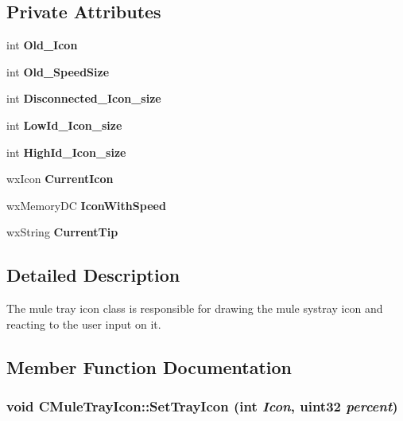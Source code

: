 \subsection*{Private Attributes}
\begin{DoxyCompactItemize}
\item 
int {\bfseries Old\_\-Icon}\label{classCMuleTrayIcon_a71dab918ad04ba3b0acf9b3c81f45ba4}

\item 
int {\bfseries Old\_\-SpeedSize}\label{classCMuleTrayIcon_a5fb943ff4b968efe8a00a13ed13c83c5}

\item 
int {\bfseries Disconnected\_\-Icon\_\-size}\label{classCMuleTrayIcon_a91c447ea8a983471036b8f285765988c}

\item 
int {\bfseries LowId\_\-Icon\_\-size}\label{classCMuleTrayIcon_a03fb9de1d4e64e8d66528a509eb823bc}

\item 
int {\bfseries HighId\_\-Icon\_\-size}\label{classCMuleTrayIcon_ad5fee0a1f8a5697517f9e5c1eba9b266}

\item 
wxIcon {\bfseries CurrentIcon}\label{classCMuleTrayIcon_ace79185140440a693dfecf48e11ac9c2}

\item 
wxMemoryDC {\bfseries IconWithSpeed}\label{classCMuleTrayIcon_adcab6989ce7d6f2dbeb918e6d2fa03d3}

\item 
wxString {\bfseries CurrentTip}\label{classCMuleTrayIcon_a2b1a37482b7a0156b7ca5c7ebc5bb214}

\end{DoxyCompactItemize}


\subsection{Detailed Description}
The mule tray icon class is responsible for drawing the mule systray icon and reacting to the user input on it. 

\subsection{Member Function Documentation}
\subsubsection[{SetTrayIcon}]{\setlength{\rightskip}{0pt plus 5cm}void CMuleTrayIcon::SetTrayIcon (int {\em Icon}, \/  uint32 {\em percent})}\label{classCMuleTrayIcon_aa711f2d5d256c71ca904a91e6b460539}



